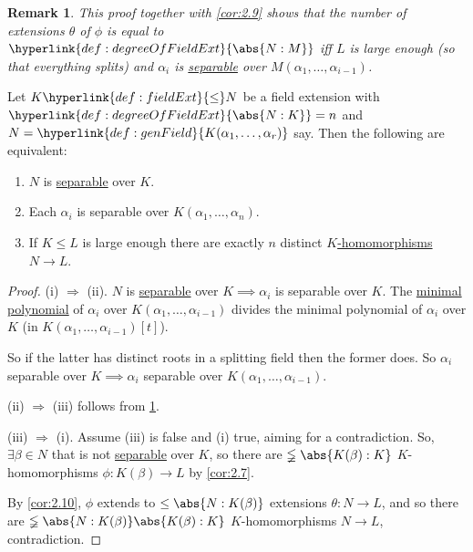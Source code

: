\documentclass{article}
\newtheorem{nremark}[nthm]{Remark}
\begin{document}
\begin{nremark}\label{rem:2.11}
    This proof together with \cref{cor:2.9} shows that the number of extensions $\theta$ of $\phi$ is equal to $\hyperlink{def:degreeOfFieldExt}{\abs{N:M}}$ iff $L$ is large enough (so that everything splits) and $\alpha_i$ is \hyperlink{def:separableExt}{separable} over \hyperlink{def:genField}{$M(\alpha_1, \dotsc, \alpha_{i-1})$}.
\end{nremark}

\begin{nlemma}\label{lem:2.12}
    Let $K \hyperlink{def:fieldExt}{\leq} N$ be a field extension with $\hyperlink{def:degreeOfFieldExt}{\abs{N:K}} = n$ and $N = \hyperlink{def:genField}{K(\alpha_1, \dotsc, \alpha_r)}$ say.
    Then the following are equivalent:
    \begin{enumerate}[label=(\roman*)]
        \item $N$ is \hyperlink{def:separable}{separable} over $K$.
        \item Each $\alpha_i$ is separable over $K(\alpha_1, \dotsc, \alpha_n)$.
        \item If $K \leq L$ is large enough there are exactly $n$ distinct \hyperlink{def:homo}{$K$-homomorphisms} $N \to L$.
    \end{enumerate}
\end{nlemma}

\begin{proof}
    (i) $\Rightarrow$ (ii).
    $N$ is \hyperlink{def:separableExt}{separable} over $K \implies \alpha_i$ is separable over $K$.
    The \hyperlink{def:minPoly}{minimal polynomial} of $\alpha_i$ over $K(\alpha_1, \dotsc, \alpha_{i-1})$ divides the minimal polynomial of $\alpha_i$ over $K$ (in $K(\alpha_1, \dotsc, \alpha_{i-1})[t]$).

    So if the latter has distinct roots in a splitting field then the former does.
    So $\alpha_i$ separable over $K \implies \alpha_i$ separable over $K(\alpha_1, \dotsc, \alpha_{i-1})$.

    (ii) $\Rightarrow$ (iii) follows from \cref{rem:2.11}.

    (iii) $\Rightarrow$ (i). Assume (iii) is false and (i) true, aiming for a contradiction.
    So, $\exists \beta \in N$ that is not \hyperlink{def:separableExt}{separable} over $K$, so there are $\lneqq\abs{K(\beta):K}$ $K$-homomorphisms $\phi:K(\beta) \to L$ by \cref{cor:2.7}.

    By \cref{cor:2.10}, $\phi$ extends to $\leq \abs{N:K(\beta)}$ extensions $\theta: N \to L$, and so there are $\lneqq\abs{N:K(\beta)}\abs{K(\beta):K}$ $K$-homomorphisms $N\to L$, contradiction.
\end{proof}
\end{document}
